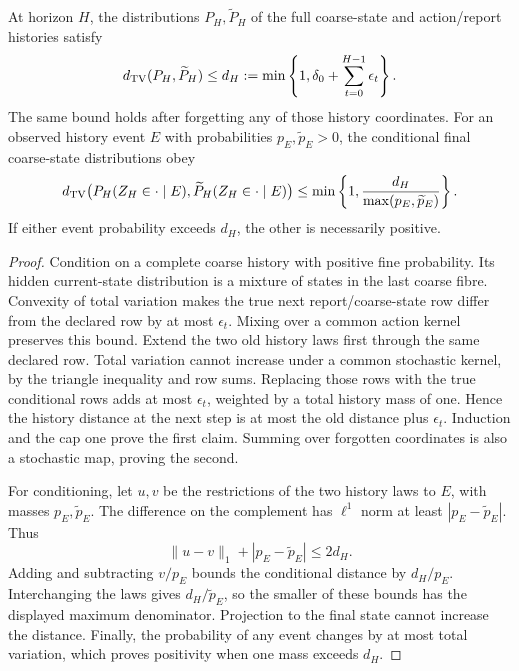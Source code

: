 \begin{Coreproposition}\label{Core:r:history-bound}
At horizon $H$, the distributions $P_H,\widetilde P_H$ of the full coarse-state and action/report histories satisfy
\[
 d_{\mathrm{TV}}(P_H,\widetilde P_H)\le d_H:=\min\left\{1,\delta_0+\sum_{t=0}^{H-1}\epsilon_t\right\}.
\]
The same bound holds after forgetting any of those history coordinates. For an observed history event $E$ with probabilities $p_E,\widetilde p_E>0$, the conditional final coarse-state distributions obey
\[
 d_{\mathrm{TV}}\bigl(P_H(Z_H\in\cdot\mid E),\widetilde P_H(Z_H\in\cdot\mid E)\bigr)
 \le\min\left\{1,\frac{d_H}{\max(p_E,\widetilde p_E)}\right\}.
\]
If either event probability exceeds $d_H$, the other is necessarily positive.
\end{Coreproposition}
\begin{proof}
Condition on a complete coarse history with positive fine probability. Its hidden current-state distribution is a mixture of states in the last coarse fibre. Convexity of total variation makes the true next report/coarse-state row differ from the declared row by at most $\epsilon_t$. Mixing over a common action kernel preserves this bound. Extend the two old history laws first through the same declared row. Total variation cannot increase under a common stochastic kernel, by the triangle inequality and row sums. Replacing those rows with the true conditional rows adds at most $\epsilon_t$, weighted by a total history mass of one. Hence the history distance at the next step is at most the old distance plus $\epsilon_t$. Induction and the cap one prove the first claim. Summing over forgotten coordinates is also a stochastic map, proving the second.

For conditioning, let $u,v$ be the restrictions of the two history laws to $E$, with masses $p_E,\widetilde p_E$. The difference on the complement has $\ell^1$ norm at least $|p_E-\widetilde p_E|$. Thus
\[
 \|u-v\|_1+|p_E-\widetilde p_E|\le2d_H.
\]
Adding and subtracting $v/p_E$ bounds the conditional distance by $d_H/p_E$. Interchanging the laws gives $d_H/\widetilde p_E$, so the smaller of these bounds has the displayed maximum denominator. Projection to the final state cannot increase the distance. Finally, the probability of any event changes by at most total variation, which proves positivity when one mass exceeds $d_H$.
\end{proof}

